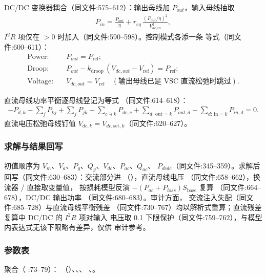 DC/DC 变换器耦合（同文件:575--612）：输出母线加 $P_{out}$，输入母线抽取
\begin{align*}
P_{in} = \frac{P_{out}}{\eta}
  + r_{eq}\,\frac{(P_{out}/\eta)^{2}}{V_{dc,in}^{2}},
\end{align*}
$I^{2}R$ 项仅在 $>0$ 时加入（同文件:590--598）。控制模式各添一条
等式（同文件:600--611）：
\begin{align*}
\text{Power:}\quad & P_{out} = P_{\mathrm{ref}};\\
\text{Droop:}\quad & P_{out} - k_{\mathrm{droop}}\,(V_{dc,out} - V_{\mathrm{ref}})
                     = P_{\mathrm{ref}};\\
\text{Voltage:}\quad & V_{dc,out} = V_{\mathrm{ref}}
\quad(\text{输出母线已是 VSC 直流松弛时跳过}).
\end{align*}

直流母线功率平衡逐母线登记为等式 （同文件:614--618）：
\begin{align*}
-P_{d,k} - \sum_{j} P_{kj} + \sum_{j} P_{jk}
+ \sum_{c\ni k} P_{dc,c} + \sum_{d:\,\mathrm{out}=k} P_{out,d}
- \sum_{d:\,\mathrm{in}=k} P_{in,d} = 0 .
\end{align*}
直流电压松弛母线钉值 $V_{dc,k}=V_{dc,\mathrm{set},k}$（同文件:620--627）。

\subsubsection*{求解与结果回写}
初值顺序为 $V_m$、$V_a$、$P_g$、$Q_g$、$V_{dc}$、$P_{ac}$、$Q_{ac}$、
$P_{dcdc}$（同文件:345--359）。求解后回写（同文件:630--683）：交流部分进
（），直流母线电压 
（同文件:658--662），换流器 / 直接取变量值，
 按损耗模型反演 $-(P_{ac}+P_{loss})S_{\mathrm{base}}$ 复算
（同文件:664--678），DC/DC 输出功率 （同文件:680--683）。审计方面，
交流注入失配（同文件:685--728）与直流母线平衡残差 
（同文件:730--767）均以解析式重算；直流残差复算中 DC/DC 的 $I^{2}R$ 项对输入
电压取 0.1 下限保护（同文件:759--762），与模型内表达式无该下限略有差异，仅供
审计参考。

\subsubsection*{参数表}
 聚合（
:73--79）：
（）、、、
、。

